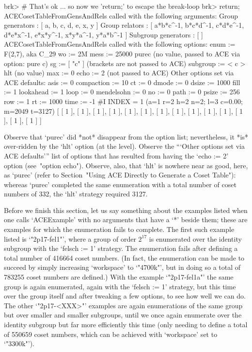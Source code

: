 brk> # That's ok ... so now we 'return;' to escape the break-loop
brk> return;
ACECosetTableFromGensAndRels called with the following arguments:
 Group generators : [ a, b, c, d, e, x, y ]
 Group relators : [ a*b*c^-1, b*c*d^-1, c*d*e^-1, d*e*x^-1, e*x*y^-1, 
  x*y*a^-1, y*a*b^-1 ]
 Subgroup generators : [  ]
ACECosetTableFromGensAndRels called with the following options:
 enum := F(2,7), aka C_29
 wo := 2M
 mess := 25000
 purec (no value, passed to ACE via option: pure c)
 sg := [ "c" ] (brackets are not passed to ACE)
 subgroup := < c >
 hlt (no value)
 max := 0
 echo := 2 (not passed to ACE)
Other options set via ACE defaults:
 asis := 0
 compaction := 10
 ct := 0
 dmode := 0
 dsize := 1000
 fill := 1
 lookahead := 1
 loop := 0
 mendelsohn := 0
 no := 0
 path := 0
 psize := 256
 row := 1
 rt := 1000
 time := -1
#I  INDEX = 1 (a=1 r=2 h=2 n=2; l=3 c=0.00; m=2049 t=3127)
[ [ 1 ], [ 1 ], [ 1 ], [ 1 ], [ 1 ], [ 1 ], [ 1 ], [ 1 ], [ 1 ], [ 1 ], 
  [ 1 ], [ 1 ], [ 1 ], [ 1 ] ]

\endexample

Observe that  `purec'  did  *not*  disappear  from  the  option  list;
nevertheless, it *is* over-ridden by the `hlt' option (at  the  {\ACE}
level). Observe the  ```Other options set via ACE defaults''' list  of
options  that  has  resulted  from  having  the  `echo  :=  2'  option
(see~"option echo"). Observe, also, that  `hlt'  is  nowhere  near  as
good, here, as  `purec'  (refer  to  Section~"Using  ACE  Directly  to
Generate  a  Coset  Table"):  whereas  `purec'  completed   the   same
enumeration with a total number of coset numbers  of  332,  the  `hlt'
strategy required 3127.

Before we finish this section, let us say something about the examples
listed when one calls `ACEExample' with no arguments that have  a  `*'
beside them; these are examples for which  the  enumeration  fails  to
complete. The first such example  listed  is  `"2p17-fel1"',  where  a
group of order $2^{17}$ is enumerated over the identity subgroup  with
the `felsch := 1' strategy. The enumeration  fails  after  defining  a
total number of 416664 coset numbers. (In fact, the enumeration can be
made to succeed by simply increasing `workspace' to `"4700k"', but  in
doing so a total of  783255  coset  numbers  are  defined.)  With  the
example `"2p17-fel1a"' the same group is again enumerated, again  with
the `felsch := 1' strategy, but this time over the  group  itself  and
after tweaking a few options, to see how well we  can  do.  The  other
`"2p17-<XXX>"' examples are again enumerations of the same  group  but
over smaller and smaller subgroups, until we once again enumerate over
the identity subgroup but far more efficiently this time (only needing
to define a total of 550659 coset numbers, which can be achieved  with
`workspace' set to `"3300k"').

